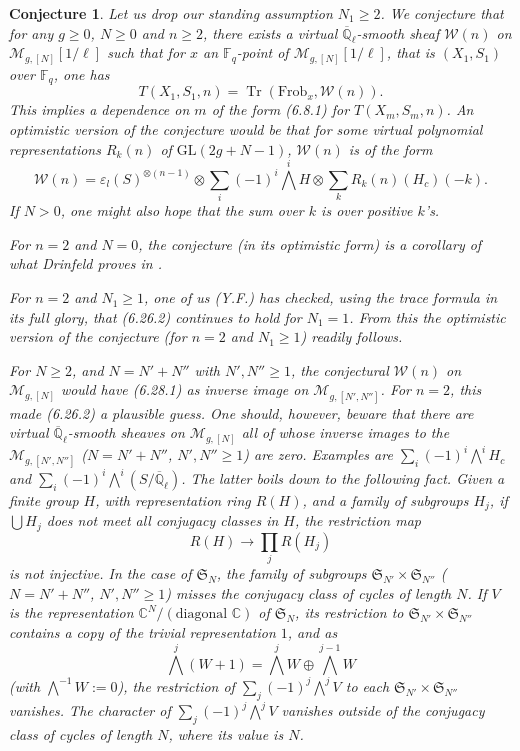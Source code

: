 \documentclass[11pt,a4paper]{article}
\theoremstyle{plain}
\newtheorem{conjecture}[theorem]{Conjecture}
\theoremstyle{definition}
\DeclareMathOperator{\Tr}{Tr}
\newcommand{\Ql}{\overline{\mathbb{Q}}_\ell}
\newcommand{\Fq}{\mathbb{F}_q}
\newcommand{\C}{\mathbb{C}}
\newcommand{\GL}{\mathrm{GL}}
\newcommand{\Frob}{\mathrm{Frob}}
\begin{document}
\begin{conjecture}\label{sec:conjectures}
Let us drop our standing assumption $N_1 \geq 2$. We conjecture that for any $g \geq 0$, $N \geq 0$ and $n \geq 2$, there exists a virtual $\Ql$-smooth sheaf $\mathcal{W}(n)$ on $\mathcal{M}_{g,[N]}[1/\ell]$ such that for $x$ an $\Fq$-point of $\mathcal{M}_{g,[N]}[1/\ell]$, that is $(X_1, S_1)$ over $\Fq$, one has
\[
T(X_1, S_1, n) = \Tr(\Frob_x, \mathcal{W}(n)).
\]
This implies a dependence on $m$ of the form (6.8.1) for $T(X_m, S_m, n)$. An optimistic version of the conjecture would be that for some virtual polynomial representations $R_k(n)$ of $\GL(2g + N - 1)$, $\mathcal{W}(n)$ is of the form
\[
\mathcal{W}(n) = \varepsilon_l(S)^{\otimes (n-1)} \otimes \sum_i (-1)^i \bigwedge^i H \otimes \sum_k R_k(n)(H_c)(-k).
\]
If $N > 0$, one might also hope that the sum over $k$ is over positive $k$'s.

For $n = 2$ and $N = 0$, the conjecture (in its optimistic form) is a corollary of what Drinfeld proves in \cite{D}.

For $n = 2$ and $N_1 \geq 1$, one of us (Y.F.) has checked, using the trace formula in its full glory, that (6.26.2) continues to hold for $N_1 = 1$. From this the optimistic version of the conjecture (for $n = 2$ and $N_1 \geq 1$) readily follows.

For $N \geq 2$, and $N = N' + N''$ with $N', N'' \geq 1$, the conjectural $\mathcal{W}(n)$ on $\mathcal{M}_{g,[N]}$ would have (6.28.1) as inverse image on $\mathcal{M}_{g,[N',N'']}$. For $n = 2$, this made (6.26.2) a plausible guess. One should, however, beware that there are virtual $\Ql$-smooth sheaves on $\mathcal{M}_{g,[N]}$ all of whose inverse images to the $\mathcal{M}_{g,[N',N'']}$ ($N = N' + N''$, $N', N'' \geq 1$) are zero. Examples are $\sum_i (-1)^i \bigwedge^i H_c$ and $\sum_i (-1)^i \bigwedge^i (S/\Ql)$. The latter boils down to the following fact. Given a finite group $H$, with representation ring $R(H)$, and a family of subgroups $H_j$, if $\bigcup H_j$ does not meet all conjugacy classes in $H$, the restriction map
\[
R(H) \to \prod_j R(H_j)
\]
is not injective. In the case of $\mathfrak{S}_N$, the family of subgroups $\mathfrak{S}_{N'} \times \mathfrak{S}_{N''}$ ($N = N' + N''$, $N', N'' \geq 1$) misses the conjugacy class of cycles of length $N$. If $V$ is the representation $\C^N/(\text{diagonal } \C)$ of $\mathfrak{S}_N$, its restriction to $\mathfrak{S}_{N'} \times \mathfrak{S}_{N''}$ contains a copy of the trivial representation $1$, and as
\[
\bigwedge^j (W + 1) = \bigwedge^j W \oplus \bigwedge^{j-1} W
\]
(with $\bigwedge^{-1} W := 0$), the restriction of $\sum_j (-1)^j \bigwedge^j V$ to each $\mathfrak{S}_{N'} \times \mathfrak{S}_{N''}$ vanishes. The character of $\sum_j (-1)^j \bigwedge^j V$ vanishes outside of the conjugacy class of cycles of length $N$, where its value is $N$.
\end{conjecture}
\end{document}
